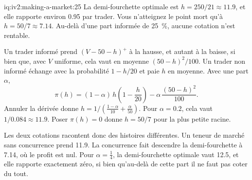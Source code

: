 \begin{solution}{iq:iv2:making-a-market:25}
La demi-fourchette optimale est $h = 250/21 \approx 11.9$, et elle rapporte environ 0.95 par trader. Vous n'atteignez le point mort qu'à $h = 50/7 \approx 7.14$. Au-delà d'une part informée de 25~\%, aucune cotation n'est rentable.

Un trader informé prend $(V - 50 - h)^+$ à la hausse, et autant à la baisse, si bien que, avec $V$ uniforme, cela vaut en moyenne $(50 - h)^2/100$. Un trader non informé échange avec la probabilité $1 - h/20$ et paie $h$ en moyenne. Avec une part $\alpha$,
\[
\pi(h) = (1 - \alpha)\, h \left(1 - \frac{h}{20}\right) - \alpha\, \frac{(50 - h)^2}{100}.
\]
Annuler la dérivée donne $h = 1\big/\left(\frac{1 - \alpha}{10} + \frac{\alpha}{50}\right)$. Pour $\alpha = 0.2$, cela vaut $1/0.084 \approx 11.9$. Poser $\pi(h) = 0$ donne $h = 50/7$ pour la plus petite racine.

Les deux cotations racontent donc des histoires différentes. Un teneur de marché sans concurrence prend 11.9. La concurrence fait descendre la demi-fourchette à 7.14, où le profit est nul. Pour $\alpha = \tfrac14$, la demi-fourchette optimale vaut 12.5, et elle rapporte exactement zéro, si bien qu'au-delà de cette part il ne faut pas coter du tout.

\end{solution}

